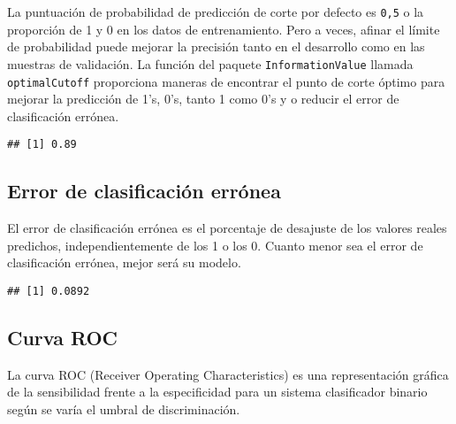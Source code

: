\documentclass[]{article}
\newenvironment{Shaded}{\begin{snugshade}}{\end{snugshade}}
\newcommand{\KeywordTok}[1]{\textcolor[rgb]{0.13,0.29,0.53}{\textbf{{#1}}}}
\newcommand{\DataTypeTok}[1]{\textcolor[rgb]{0.13,0.29,0.53}{{#1}}}
\newcommand{\DecValTok}[1]{\textcolor[rgb]{0.00,0.00,0.81}{{#1}}}
\newcommand{\StringTok}[1]{\textcolor[rgb]{0.31,0.60,0.02}{{#1}}}
\newcommand{\NormalTok}[1]{{#1}}
\numberwithin{equation}{section}
\begin{document}
La puntuación de probabilidad de predicción de corte por defecto es
\texttt{0,5} o la proporción de 1 y 0 en los datos de entrenamiento.
Pero a veces, afinar el límite de probabilidad puede mejorar la
precisión tanto en el desarrollo como en las muestras de validación. La
función del paquete \texttt{InformationValue} llamada
\texttt{optimalCutoff} proporciona maneras de encontrar el punto de
corte óptimo para mejorar la predicción de 1's, 0's, tanto 1 como 0's y
o reducir el error de clasificación errónea.

\begin{Shaded}
\end{Shaded}

\begin{verbatim}
## [1] 0.89
\end{verbatim}

\subsection{Error de clasificación
errónea}\label{error-de-clasificacion-erronea}

El error de clasificación errónea es el porcentaje de desajuste de los
valores reales predichos, independientemente de los 1 o los 0. Cuanto
menor sea el error de clasificación errónea, mejor será su modelo.

\begin{Shaded}
\end{Shaded}

\begin{verbatim}
## [1] 0.0892
\end{verbatim}

\subsection{Curva ROC}\label{curva-roc}

La curva ROC (Receiver Operating Characteristics) es una representación
gráfica de la sensibilidad frente a la especificidad para un sistema
clasificador binario según se varía el umbral de discriminación.
\end{document}
